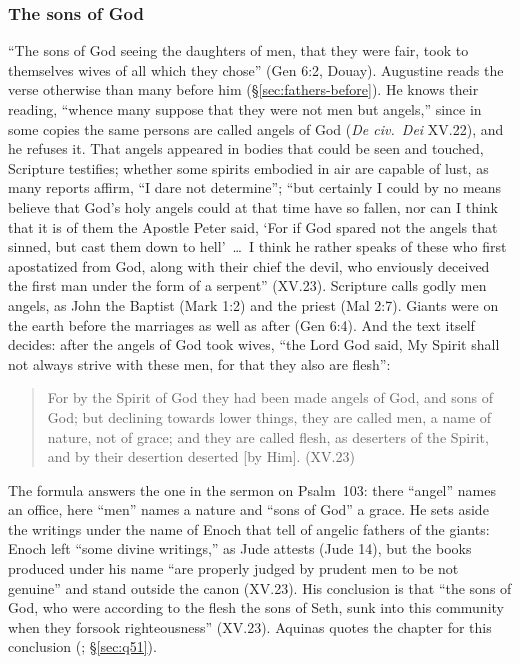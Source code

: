 \subsubsection{The sons of God}\label{sec:aug-gen6}

``The sons of God seeing the daughters of men, that they were fair, took
to themselves wives of all which they chose'' (Gen 6:2, Douay). Augustine
reads the verse otherwise than many before him (\S\ref{sec:fathers-before}).
He knows their reading, ``whence many suppose that they were not men but
angels,'' since in some copies the same persons are called angels of God
(\emph{De civ.\ Dei} XV.22), and he refuses it. That angels appeared in
bodies that could be seen and touched, Scripture testifies; whether some
spirits embodied in air are capable of lust, as many reports affirm, ``I
dare not determine''; ``but certainly I could by no means believe that
God's holy angels could at that time have so fallen, nor can I think that
it is of them the Apostle Peter said, `For if God spared not the angels
that sinned, but cast them down to hell'~\dots\ I think he rather speaks
of these who first apostatized from God, along with their chief the
devil, who enviously deceived the first man under the form of a serpent''
(XV.23). Scripture calls godly men angels, as John the Baptist (Mark 1:2)
and the priest (Mal 2:7). Giants were on the earth before the marriages
as well as after (Gen 6:4). And the text itself decides: after the
angels of God took wives, ``the Lord God said, My Spirit shall not always
strive with these men, for that they also are flesh'':
\begin{quote}
For by the Spirit of God they had been made angels of God, and sons of
God; but declining towards lower things, they are called men, a name of
nature, not of grace; and they are called flesh, as deserters of the
Spirit, and by their desertion deserted [by Him]. (XV.23)
\end{quote}
The formula answers the one in the sermon on Psalm~103: there ``angel''
names an office, here ``men'' names a nature and ``sons of God'' a grace.
He sets aside the writings under the name of Enoch that tell of angelic
fathers of the giants: Enoch left ``some divine writings,'' as Jude
attests (Jude 14), but the books produced under his name ``are properly
judged by prudent men to be not genuine'' and stand outside the canon
(XV.23). His conclusion is that ``the sons of
God, who were according to the flesh the sons of Seth, sunk into this
community when they forsook righteousness'' (XV.23). Aquinas quotes the
chapter for this conclusion (; \S\ref{sec:q51}).


